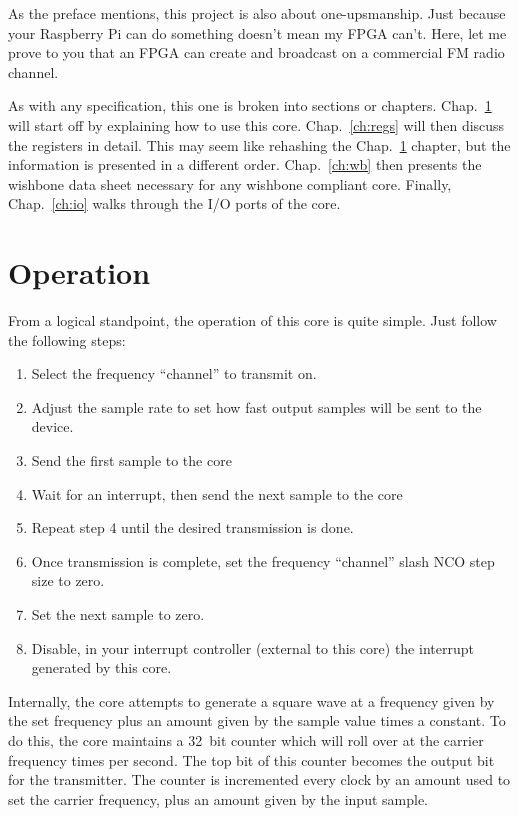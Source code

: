 \documentclass{gqtekspec}
\begin{document}
As the preface mentions, this project is also about one-upsmanship.  Just
because your Raspberry Pi can do something doesn't mean my FPGA can't.  Here,
let me prove to you that an FPGA can create and broadcast on a commercial
FM radio channel.

As with any specification, this one is broken into sections or chapters.  
Chap.~\ref{ch:ops} will start off by explaining how to use this core.
Chap.~\ref{ch:regs} will then discuss the registers in detail.  This may seem
like rehashing the Chap.~\ref{ch:ops} chapter, but the information is presented
in a different order.  Chap.~\ref{ch:wb} then presents the wishbone data sheet
necessary for any wishbone compliant core.  Finally, Chap.~\ref{ch:io} walks
through the I/O ports of the core. 

\chapter{Operation}\label{ch:ops}

From a logical standpoint, the operation of this core is quite simple.  Just
follow the following steps:
\begin{enumerate}
\item Select the frequency ``channel'' to transmit on.
\item Adjust the sample rate to set how fast output samples will be sent to the
	device.
\item Send the first sample to the core
\item Wait for an interrupt, then send the next sample to the core
\item Repeat step 4 until the desired transmission is done.
\item Once transmission is complete, set the frequency ``channel'' slash 
	NCO step size to zero.
\item Set the next sample to zero.
\item Disable, in your interrupt controller (external to this core) the
	interrupt generated by this core.
\end{enumerate}

Internally, the core attempts to generate a square wave at a frequency given by
the set frequency plus an amount given by the sample value times a constant.
To do this, the core maintains a 32~bit counter which will roll over at the
carrier
frequency times per second.  The top bit of this counter becomes the output
bit for the transmitter.   The counter is incremented every clock by an amount
used to set the carrier frequency, plus an amount given by the input sample.
\end{document}
